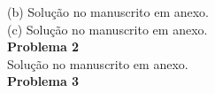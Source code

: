 \documentclass[12pt,portuguese,a4paper,pdftex]{article}
\renewcommand{\baselinestretch}{1.5}
\begin{document}
% 

\vspace{1cm}
\hspace{-6mm}(b) Solução no manuscrito em anexo.\\
(c) Solução no manuscrito em anexo.\\


{\bf Problema 2}\\
Solução no manuscrito em anexo.\\

{\bf Problema 3}
\end{document}
